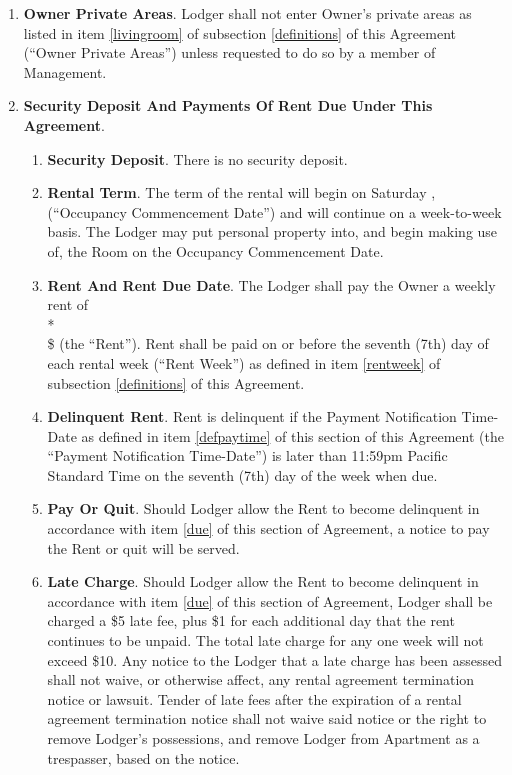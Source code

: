 \documentclass[12pt,letterpaper]{article}
\newcommand{\datefillin}{\hspace{0.2cm}\makebox[.2\linewidth]{\hrulefill}}
\newcommand{\lodger}{Lodger}
\newcommand{\management}{Management}
\newcommand{\apt}{Apartment}
\newcommand{\room}{Room}
\newcommand{\furniture}{Furniture, Kitchenware, Linen, etc.}
\newcommand{\livingroom}{Owner Private Areas}
\newcommand{\firstday}{Occupancy Commencement Date}
\newcommand{\rentweek}{Rent Week}
\newcommand{\paymenttime}{Payment Notification Time-Date}
\begin{document}
\begin{enumerate}
\begin{enumerate}
			\item \textbf{\furniture{}}. \management{} shall provide the \furniture{} listed in item \ref{furniture} of subsection \ref{definitions} of this Agreement{} (``\furniture{}'') in usable condition and maintain same in usable condition during the time \room{} is rented to \lodger{}.
		\end{enumerate}
	\item \textbf{\livingroom{}}. \lodger{} shall not enter Owner's private areas as listed in item \ref{livingroom} of subsection \ref{definitions} of this Agreement (``\livingroom{}'') unless requested to do so by a member of \management{}.
	\item \textbf{Security Deposit And Payments Of Rent Due Under This Agreement}. 
		\begin{enumerate}
			\item \textbf{Security Deposit}. There is no security deposit. 
			\item \textbf{Rental Term}. The term of the rental will begin on Saturday \datefillin, (``\firstday{}'') and will continue on a week-to-week basis. The \lodger{} may put personal property into, and begin making use of, the \room{} on the \firstday{}.
			\item \textbf{Rent And Rent Due Date}. The \lodger{} shall pay the Owner a weekly rent of\\* \\ 
				\$\datefillin{} (the ``Rent''). Rent shall be paid on or before the seventh (7th) day of each rental week (``\rentweek{}'') as defined in item \ref{rentweek} of subsection \ref{definitions} of this Agreement. 
			\item \textbf{Delinquent Rent}. \label{due}
					Rent is delinquent if the \paymenttime{} as defined in item \ref{defpaytime} of this section of this Agreement (the ``\paymenttime{}'') is later than 11:59pm Pacific Standard Time on the seventh (7th) day of the week when due. 
			\item \textbf{Pay Or Quit}. Should \lodger{} allow the Rent to become delinquent in accordance with item \ref{due} of this section of Agreement, a notice to pay the Rent or quit will be served. 
			\item \textbf{Late Charge}. Should \lodger{} allow the Rent to become delinquent in accordance with item \ref{due} of this section of Agreement, \lodger{} shall be charged a \$5 late fee, plus \$1 for each additional day that the rent continues to be unpaid.  The total late charge for any one week will not exceed \$10. Any notice to the \lodger{} that a late charge has been assessed shall not waive, or otherwise affect, any rental agreement termination notice or lawsuit. Tender of late fees after the expiration of a rental agreement termination notice shall not waive said notice or the right to remove \lodger{}'s possessions, and remove \lodger{} from \apt{} as a trespasser, based on the notice. 

\end{enumerate}
\end{enumerate}
\end{document}
